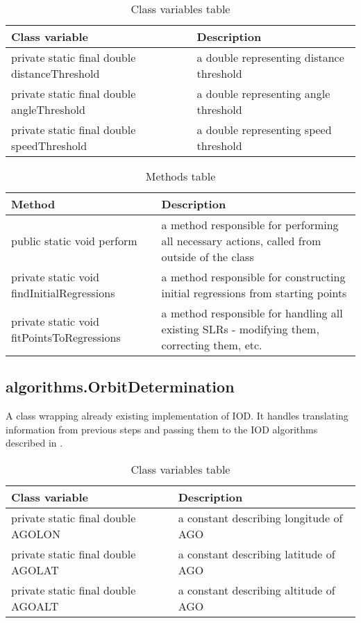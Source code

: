 \begin{table}[H]
\centering
\caption{Class variables table}
\setlength{\extrarowheight}{2pt}
\label{tab:class_variables_LR}
\begin{tabularx}{\textwidth}{|X|X|}
\hline
\textbf{Class variable} & \textbf{Description} \\ \hline
private static final double \mbox{distanceThreshold} & a double representing distance threshold \\ \hline
private static final double \mbox{angleThreshold} & a double representing angle threshold    \\ \hline
private static final double \mbox{speedThreshold} & a double representing speed threshold    \\ \hline
\end{tabularx}
\end{table}

\begin{table}[H]
\centering
\caption{Methods table}
\setlength{\extrarowheight}{2pt}
\label{tab:class_methods_LR}
\begin{tabularx}{\textwidth}{|X|X|}
\hline
\textbf{Method} & \textbf{Description} \\ \hline
public static void \mbox{perform} & a method responsible for performing all necessary actions, called from outside of the class \\ \hline
private static void \mbox{findInitialRegressions} & a method responsible for constructing initial regressions from starting points\\ \hline
private static void \mbox{fitPointsToRegressions} & a method responsible for handling all existing SLRs - modifying them, correcting them, etc.\\ \hline
\end{tabularx}
\end{table}

\subsection{algorithms.OrbitDetermination}

	A class wrapping already existing implementation of IOD. It handles translating information from previous steps and passing them to the IOD algorithms described in .
	
\begin{table}[H]
\centering
\caption{Class variables table}
\setlength{\extrarowheight}{2pt}
\label{tab:class_variables_OD}
\begin{tabularx}{\textwidth}{|X|X|}
\hline
\textbf{Class variable} & \textbf{Description} \\ \hline
private static final double \mbox{AGOLON} & a constant describing longitude of AGO \\ \hline
private static final double \mbox{AGOLAT} & a constant describing latitude of AGO\\ \hline
private static final double \mbox{AGOALT} & a constant describing altitude of AGO\\ \hline
\end{tabularx}
\end{table}

